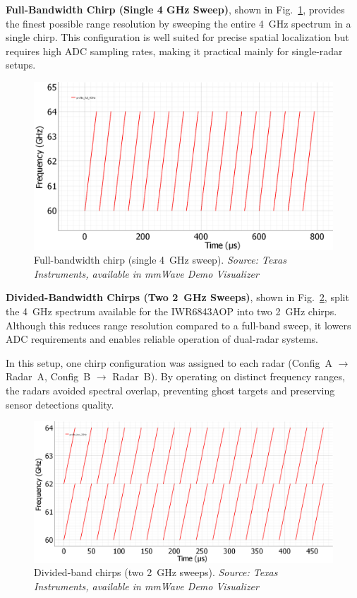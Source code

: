\textbf{Full-Bandwidth Chirp (Single 4 GHz Sweep)}, shown in Fig.~\ref{fig:profile4GHz}, provides the finest possible range resolution by sweeping the entire 4~GHz spectrum in a single chirp.  
This configuration is well suited for precise spatial localization but requires high ADC sampling rates, making it practical mainly for single-radar setups.  

\begin{figure}[!htbp]
    \centering
    \includegraphics[width=0.7\linewidth]{images/profile_full_4GHz.png}
    \caption{Full-bandwidth chirp (single 4~GHz sweep).  
    \textit{Source: Texas Instruments, available in mmWave Demo Visualizer \cite{mmwave_demo_doc}}}
    \label{fig:profile4GHz}
\end{figure}

\textbf{Divided-Bandwidth Chirps (Two 2~GHz Sweeps)}, shown in Fig.~\ref{fig:profile2GHz}, split the 4~GHz spectrum available for the IWR6843AOP into two 2~GHz chirps.  
Although this reduces range resolution compared to a full-band sweep, it lowers ADC requirements and enables reliable operation of dual-radar systems.  

In this setup, one chirp configuration was assigned to each radar (Config~A $\rightarrow$ Radar~A, Config~B $\rightarrow$ Radar~B).  
By operating on distinct frequency ranges, the radars avoided spectral overlap, preventing ghost targets and preserving sensor detections quality.  

\begin{figure}[!htbp]
    \centering
    \includegraphics[width=0.7\linewidth]{images/profile_two_2GHz.png}
    \caption{Divided-band chirps (two 2~GHz sweeps).  
    \textit{Source: Texas Instruments, available in mmWave Demo Visualizer \cite{mmwave_demo_doc}}}
    \label{fig:profile2GHz}
\end{figure}

